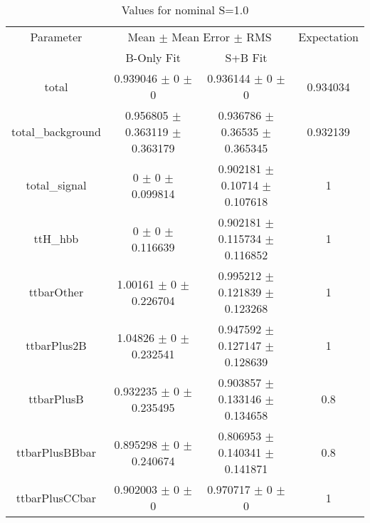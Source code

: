 \begin{table}
\centering
\caption{Values for nominal S=1.0}
\begin{tabular}{cccc}
\toprule
Parameter & \multicolumn{2}{c}{Mean $\pm$ Mean Error $\pm$ RMS} & Expectation\\
 & B-Only Fit & S+B Fit & \\
\midrule
total & \num{0.939046} $\pm$ \num{0} $\pm$ \num{0} & \num{0.936144} $\pm$ \num{0} $\pm$ \num{0} & \num{0.934034}\\
total\_background & \num{0.956805} $\pm$ \num{0.363119} $\pm$ \num{0.363179} & \num{0.936786} $\pm$ \num{0.36535} $\pm$ \num{0.365345} & \num{0.932139}\\
total\_signal & \num{0} $\pm$ \num{0} $\pm$ \num{0.099814} & \num{0.902181} $\pm$ \num{0.10714} $\pm$ \num{0.107618} & \num{1}\\
ttH\_hbb & \num{0} $\pm$ \num{0} $\pm$ \num{0.116639} & \num{0.902181} $\pm$ \num{0.115734} $\pm$ \num{0.116852} & \num{1}\\
ttbarOther & \num{1.00161} $\pm$ \num{0} $\pm$ \num{0.226704} & \num{0.995212} $\pm$ \num{0.121839} $\pm$ \num{0.123268} & \num{1}\\
ttbarPlus2B & \num{1.04826} $\pm$ \num{0} $\pm$ \num{0.232541} & \num{0.947592} $\pm$ \num{0.127147} $\pm$ \num{0.128639} & \num{1}\\
ttbarPlusB & \num{0.932235} $\pm$ \num{0} $\pm$ \num{0.235495} & \num{0.903857} $\pm$ \num{0.133146} $\pm$ \num{0.134658} & \num{0.8}\\
ttbarPlusBBbar & \num{0.895298} $\pm$ \num{0} $\pm$ \num{0.240674} & \num{0.806953} $\pm$ \num{0.140341} $\pm$ \num{0.141871} & \num{0.8}\\
ttbarPlusCCbar & \num{0.902003} $\pm$ \num{0} $\pm$ \num{0} & \num{0.970717} $\pm$ \num{0} $\pm$ \num{0} & \num{1}\\
\bottomrule
\end{tabular}
\end{table}